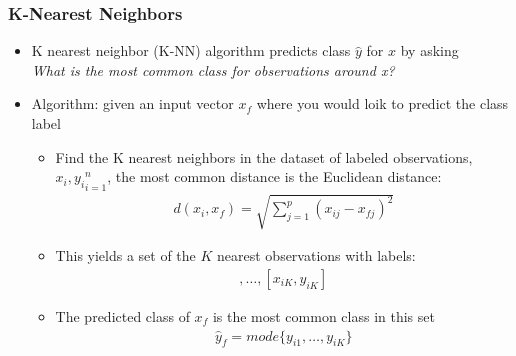 \documentclass[
  shownotes,
  xcolor={svgnames},
  hyperref={colorlinks,citecolor=DarkBlue,linkcolor=DarkRed,urlcolor=DarkBlue}
  , aspectratio=169]{beamer}
\begin{document}
\begin{frame}[fragile]
\frametitle{K-Nearest Neighbors}

\begin{itemize}
\item K nearest neighbor (K-NN) algorithm predicts class $\hat y$ for $x$ by asking \\
{\it What is the most common class for observations around x?}
\item Algorithm: given an input vector $x_f$ where you would loik to predict the class label

\begin{itemize}
  \item Find the K nearest neighbors in the dataset of labeled observations, ${x_i,y_i}_{i=1}^n$, the most common distance is the Euclidean distance:
  \begin{align}
  d(x_i,x_f)=\sqrt{\sum_{j=1}^p(x_{ij}-x_{fj})^2}
  \end{align}
  \item This yields a set of the $K$ nearest observations with labels: 
  \begin{align}
  [x_{i1},y_{i1}],\dots,[x_{iK},y_{iK}]
  \end{align}
  \item The predicted class of $x_f$ is the most common class in this set
  \begin{align}
  \hat{y}_f =mode\{y_{i1},\dots,y_{iK}\}
  \end{align}
\end{itemize}

\end{itemize}
\end{frame}
\end{document}
